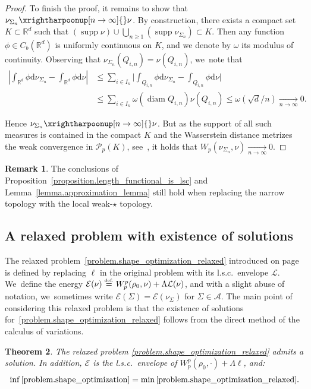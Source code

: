 \documentclass[10pt]{amsart}
\newtheorem{theorem}{Theorem}[section]
\theoremstyle{definition}
\newtheorem{remark}[theorem]{Remark}
\newcommand{\eqdef}{\ensuremath{\stackrel{\mbox{\upshape\tiny def.}}{=}}}
\newcommand\A{\mathcal{A}}
\newcommand\E{\mathcal{E}}
\newcommand{\RR}{\mathbb{R}}
\DeclareMathOperator{\diam}{diam}
\DeclareMathOperator{\supp}{supp}
\newcommand\dd{\mathrm{d}}
\begin{document}
\begin{proof}
To finish the proof, it remains to show that $\nu_{\Sigma_n} \xrightharpoonup[n \to \infty]{} \nu$. By construction, there exists a compact set $K \subset \RR^d$ such that $(\supp \nu)\cup \bigcup_{n\geq 1} \left(\supp \nu_{\Sigma_n}\right) \subset K$. Then any function $\phi \in C_b(\RR^d)$ is uniformly continuous on $K$, and we denote by $\omega$ its modulus of continuity.
Observing that $\nu_{\Sigma_n}(Q_{i,n}) = \nu(Q_{i,n})$, we~note that
\begin{align*}
\left|
\int_{\RR^d}\phi\dd\nu_{\Sigma_n}
-
\int_{\RR^d}\phi\dd\nu
\right|
&\le
\sum_{i \in I_n}
\biggl|
\int_{Q_{i,n}}\phi\dd\nu_{\Sigma_n} - \int_{Q_{i,n}}\phi\dd\nu
\biggr|\\
&\le
\sum_{i \in I_n} \omega(\diam Q_{i,n})\nu(Q_{i,n})
\le
\omega(\sqrt{d}/{n}) \xrightarrow[n \to \infty]{} 0.
\end{align*}

Hence $\nu_{\Sigma_n} \xrightharpoonup[n \to \infty]{} \nu$. But as the support of all such measures is contained in the compact $K$ and the Wasserstein distance metrizes the weak convergence in $\mathcal{P}_p(K)$, see~\cite[Th.\,5.10]{santambrogio2015optimal}, it holds that $W_p(\nu_{\Sigma_n}, \nu) \xrightarrow[n \to \infty]{} 0$.
\end{proof}

\begin{remark}
The conclusions of Proposition~\ref{proposition.length_functional_is_lsc} and Lemma~\ref{lemma.approximation_lemma} still hold when replacing the narrow topology with the local weak-$\star$ topology.
\end{remark}

\subsection{A relaxed problem with existence of solutions}
The relaxed problem~\eqref{problem.shape_optimization_relaxed} introduced on page~\pageref{problem.shape_optimization_relaxed} is defined by replacing $\ell$ in the original problem with its l.s.c.~envelope $\mathcal{L}$. We~define the energy $\E(\nu) \eqdef W_p^p(\rho_0, \nu) + \Lambda \mathcal{L}(\nu)$, and with a slight abuse of notation, we~sometimes write $\mathcal{E}(\Sigma) = \mathcal{E}(\nu_{\Sigma})$ for $\Sigma \in \A$.
The main point of considering this relaxed problem is that the existence of solutions for~\eqref{problem.shape_optimization_relaxed} follows from the direct method of the calculus of variations.

\begin{theorem}\label{theorem.existence_relaxed_problem}
The relaxed problem \eqref{problem.shape_optimization_relaxed} admits a solution. In addition, $\mathcal{E}$ is the l.s.c.~envelope of $W_p^p(\rho_0, \cdot) + \Lambda \ell$, and:
\[
\inf \eqref{problem.shape_optimization} =
\min \eqref{problem.shape_optimization_relaxed}.
\]
\end{theorem}
\end{document}
